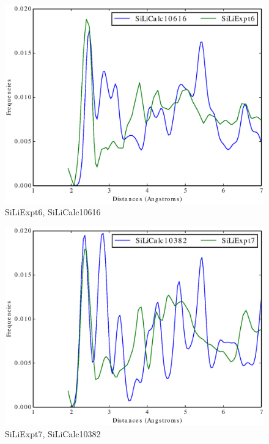\documentclass[12pt,letterpaper]{article}
\begin{document}
\begin{figure}[ht]
  \begin{center}
    \includegraphics[scale=0.8]{figs/SparseRepSiLiExpt6-SiLiCalc10616.eps}
    \caption{SiLiExpt6, SiLiCalc10616}
  \end{center}
\end{figure}

\begin{figure}[ht]
  \begin{center}
    \includegraphics[scale=0.8]{figs/SparseRepSiLiExpt7-SiLiCalc10382.eps}
    \caption{SiLiExpt7, SiLiCalc10382}
  \end{center}
\end{figure}
\end{document}
